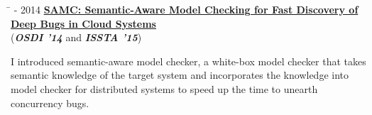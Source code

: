 \documentclass[10pt]{article} %
\begin{document}
\begin{tabbing}
\hspace{2.5cm} \=  - 2014 \> \href{http://ucare.cs.uchicago.edu/pdf/osdi14-samc.pdf}{\textbf{SAMC: Semantic-Aware Model Checking for Fast Discovery of Deep Bugs in Cloud Systems}} \\
\>\+ (\textit{\textbf{OSDI '14}} and \textit{\textbf{ISSTA '15}}) \\
\begin{minipage}{\smallertextwidth}
I introduced semantic-aware model checker, a white-box model checker that takes
semantic knowledge of the target system and incorporates the knowledge into
model checker for distributed systems to speed up the time to unearth
concurrency bugs.
\end{minipage}
\end{tabbing}


\end{document}

